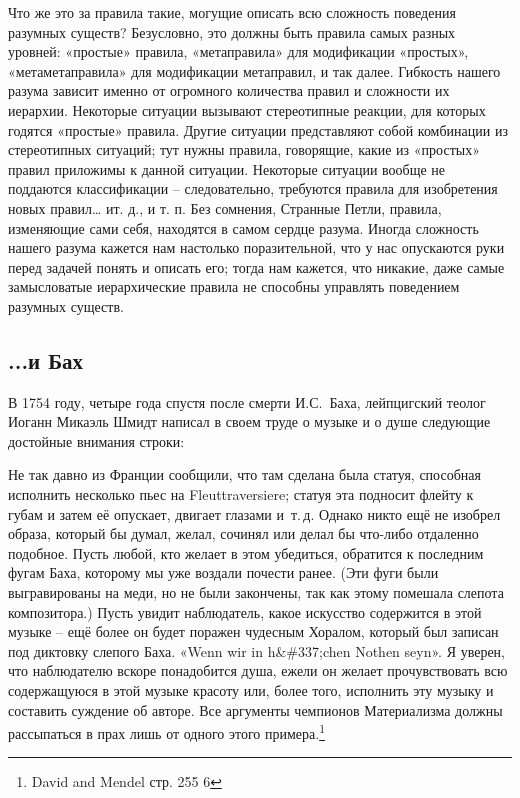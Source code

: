 \documentclass[../main.tex]{subfiles}
\begin{document}
Что же это за правила такие, могущие описать всю сложность поведения разумных существ? Безусловно, это должны быть правила самых разных уровней: «простые» правила, «метаправила» для модификации «простых», «метаметаправила» для модификации метаправил, и так далее. Гибкость нашего разума зависит именно от огромного количества правил и сложности их иерархии. Некоторые ситуации вызывают стереотипные реакции, для которых годятся «простые» правила. Другие ситуации представляют собой комбинации из стереотипных ситуаций; тут нужны правила, говорящие, какие из «простых» правил приложимы к данной ситуации. Некоторые ситуации вообще не поддаются классификации \--- следовательно, требуются правила для изобретения новых правил\ldots{} ит. д., и т. п. Без сомнения, Странные Петли, правила, изменяющие сами себя, находятся в самом сердце разума. Иногда сложность нашего разума кажется нам настолько поразительной, что у нас опускаются руки перед задачей понять и описать его; тогда нам кажется, что никакие, даже самые замысловатые иерархические правила не способны управлять поведением разумных существ.


\subsection{...и Бах}

В 1754 году, четыре года спустя после смерти И.С.~Баха, лейпцигский теолог Иоганн Микаэль Шмидт написал в своем труде о музыке и о душе следующие достойные внимания строки:

Не так давно из Франции сообщили, что там сделана была статуя, способная исполнить несколько пьес на Fleuttraversiere; статуя эта подносит флейту к губам и затем её опускает, двигает глазами и~т.\,д. Однако никто ещё не изобрел образа, который бы думал, желал, сочинял или делал бы что-либо отдаленно подобное. Пусть любой, кто желает в этом убедиться, обратится к последним фугам Баха, которому мы уже воздали почести ранее. (Эти фуги были выгравированы на меди, но не были закончены, так как этому помешала слепота композитора.) Пусть увидит наблюдатель, какое искусство содержится в этой музыке \--- ещё более он будет поражен чудесным Хоралом, который был записан под диктовку слепого Баха. «Wenn wir in h\&\#337;chen Nothen seyn». Я уверен, что наблюдателю вскоре понадобится душа, ежели он желает прочувствовать всю содержащуюся в этой музыке красоту или, более того, исполнить эту музыку и составить суждение об авторе. Все аргументы чемпионов Материализма должны рассыпаться в прах лишь от одного этого примера.\footnote{David and Mendel стр. 255 6}
\end{document}
